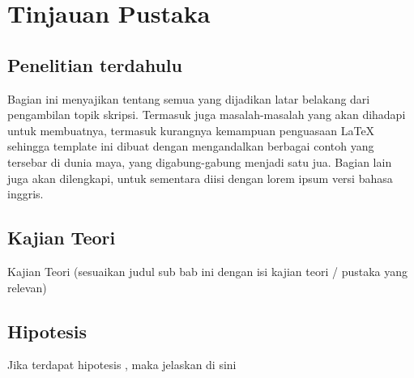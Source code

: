 \chapter{Tinjauan Pustaka}
\label{chap: pustaka}
\section{Penelitian terdahulu}
\label{sec:penelitianterdahulu}

Bagian ini menyajikan tentang semua yang dijadikan latar belakang dari pengambilan topik skripsi.
Termasuk juga masalah-masalah yang akan dihadapi untuk membuatnya, termasuk kurangnya kemampuan penguasaan \LaTeX{} sehingga template ini dibuat dengan mengandalkan berbagai contoh yang tersebar di dunia maya, yang digabung-gabung menjadi satu jua.
Bagian lain juga akan dilengkapi, untuk sementara diisi dengan lorem ipsum versi bahasa inggris.


\section{Kajian Teori}
\label{sec:teori}
Kajian Teori (sesuaikan judul sub bab ini dengan isi kajian teori / pustaka yang relevan)


\section{Hipotesis}
\label{sec:hipotesis}
Jika terdapat hipotesis , maka jelaskan di sini

